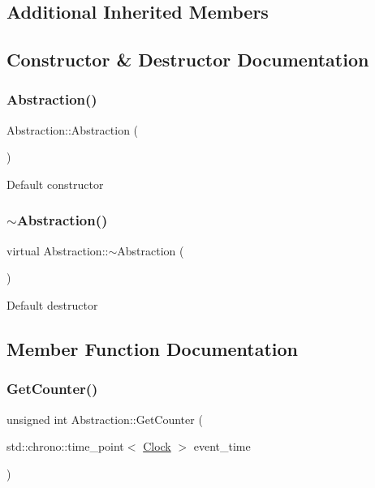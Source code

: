 \subsection*{Additional Inherited Members}


\subsection{Constructor \& Destructor Documentation}
\mbox{\label{classAbstraction_af4bf8b0e2bfd07d50ffc28b98f35b2ee}} 
\subsubsection{\texorpdfstring{Abstraction()}{Abstraction()}}
{\footnotesize\ttfamily Abstraction\+::\+Abstraction (\begin{DoxyParamCaption}{ }\end{DoxyParamCaption})}

Default constructor \mbox{\label{classAbstraction_aaf7d34417ea08792cc2b9449f9bfdc8e}} 
\subsubsection{\texorpdfstring{$\sim$\+Abstraction()}{~Abstraction()}}
{\footnotesize\ttfamily virtual Abstraction\+::$\sim$\+Abstraction (\begin{DoxyParamCaption}{ }\end{DoxyParamCaption})\hspace{0.3cm}{\ttfamily [virtual]}}

Default destructor 

\subsection{Member Function Documentation}
\mbox{\label{classAbstraction_a2b5e781d95a843a67db307b431f419a7}} 
\subsubsection{\texorpdfstring{Get\+Counter()}{GetCounter()}}
{\footnotesize\ttfamily unsigned int Abstraction\+::\+Get\+Counter (\begin{DoxyParamCaption}\item[{std\+::chrono\+::time\+\_\+point$<$ \mbox{\hyperlink{universe_8h_a0ef8d951d1ca5ab3cfaf7ab4c7a6fd80}{Clock}} $>$}]{event\+\_\+time }\end{DoxyParamCaption})\hspace{0.3cm}{\ttfamily [inline]}}


